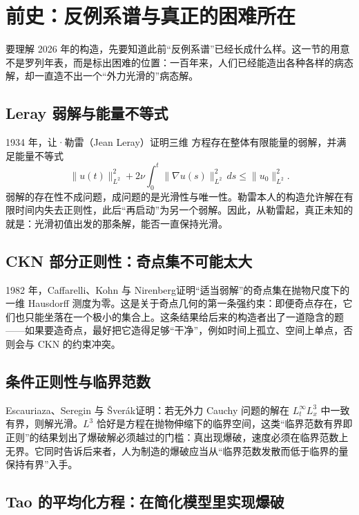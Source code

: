 \section{前史：反例系谱与真正的困难所在}

要理解 2026 年的构造，先要知道此前“反例系谱”已经长成什么样。这一节的用意不是罗列年表，而是标出困难的位置：一百年来，人们已经能造出各种各样的病态解，却一直造不出一个“外力光滑的”病态解。

\subsection{Leray 弱解与能量不等式}

1934 年，让·勒雷（Jean Leray）\cite{leray}证明三维 \NS{} 方程存在整体有限能量的弱解，并满足能量不等式
\begin{equation}
\|u(t)\|_{L^{2}}^{2}+2\nu\int_{0}^{t}\|\nabla u(s)\|_{L^{2}}^{2}\,ds\le\|u_{0}\|_{L^{2}}^{2}.
\end{equation}
弱解的存在性不成问题，成问题的是光滑性与唯一性。勒雷本人的构造允许解在有限时间内失去正则性，此后“再启动”为另一个弱解。因此，从勒雷起，真正未知的就是：光滑初值出发的那条解，能否一直保持光滑。

\subsection{CKN 部分正则性：奇点集不可能太大}

1982 年，Caffarelli、Kohn 与 Nirenberg\cite{ckn}证明“适当弱解”的奇点集在抛物尺度下的一维 Hausdorff 测度为零。这是关于奇点几何的第一条强约束：即便奇点存在，它们也只能坐落在一个极小的集合上。这条结果给后来的构造者出了一道隐含的题——如果要造奇点，最好把它造得足够“干净”，例如时间上孤立、空间上单点，否则会与 CKN 的约束冲突。

\subsection{条件正则性与临界范数}

Escauriaza、Seregin 与 Šverák\cite{ess}证明：若无外力 Cauchy 问题的解在 $L_{t}^{\infty}L_{x}^{3}$ 中一致有界，则解光滑。$L^{3}$ 恰好是方程在抛物伸缩下的临界空间，这类“临界范数有界即正则”的结果划出了爆破解必须越过的门槛：真出现爆破，速度必须在临界范数上无界。它同时告诉后来者，人为制造的爆破应当从“临界范数发散而低于临界的量保持有界”入手。

\subsection{Tao 的平均化方程：在简化模型里实现爆破}

